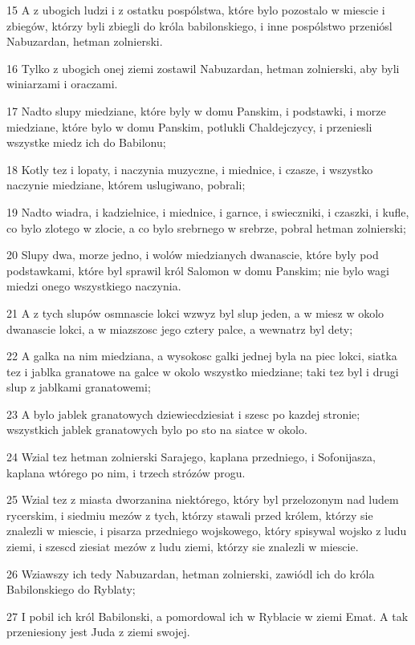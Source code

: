 \par 15 A z ubogich ludzi i z ostatku pospólstwa, które bylo pozostalo w miescie i zbiegów, którzy byli zbiegli do króla babilonskiego, i inne pospólstwo przeniósl Nabuzardan, hetman zolnierski.
\par 16 Tylko z ubogich onej ziemi zostawil Nabuzardan, hetman zolnierski, aby byli winiarzami i oraczami.
\par 17 Nadto slupy miedziane, które byly w domu Panskim, i podstawki, i morze miedziane, które bylo w domu Panskim, potlukli Chaldejczycy, i przeniesli wszystke miedz ich do Babilonu;
\par 18 Kotly tez i lopaty, i naczynia muzyczne, i miednice, i czasze, i wszystko naczynie miedziane, którem uslugiwano, pobrali;
\par 19 Nadto wiadra, i kadzielnice, i miednice, i garnce, i swieczniki, i czaszki, i kufle, co bylo zlotego w zlocie, a co bylo srebrnego w srebrze, pobral hetman zolnierski;
\par 20 Slupy dwa, morze jedno, i wolów miedzianych dwanascie, które byly pod podstawkami, które byl sprawil król Salomon w domu Panskim; nie bylo wagi miedzi onego wszystkiego naczynia.
\par 21 A z tych slupów osmnascie lokci wzwyz byl slup jeden, a w miesz w okolo dwanascie lokci, a w miazszosc jego cztery palce, a wewnatrz byl dety;
\par 22 A galka na nim miedziana, a wysokosc galki jednej byla na piec lokci, siatka tez i jablka granatowe na galce w okolo wszystko miedziane; taki tez byl i drugi slup z jablkami granatowemi;
\par 23 A bylo jablek granatowych dziewiecdziesiat i szesc po kazdej stronie; wszystkich jablek granatowych bylo po sto na siatce w okolo.
\par 24 Wzial tez hetman zolnierski Sarajego, kaplana przedniego, i Sofonijasza, kaplana wtórego po nim, i trzech strózów progu.
\par 25 Wzial tez z miasta dworzanina niektórego, który byl przelozonym nad ludem rycerskim, i siedmiu mezów z tych, którzy stawali przed królem, którzy sie znalezli w miescie, i pisarza przedniego wojskowego, który spisywal wojsko z ludu ziemi, i szescd ziesiat mezów z ludu ziemi, którzy sie znalezli w miescie.
\par 26 Wziawszy ich tedy Nabuzardan, hetman zolnierski, zawiódl ich do króla Babilonskiego do Ryblaty;
\par 27 I pobil ich król Babilonski, a pomordowal ich w Ryblacie w ziemi Emat. A tak przeniesiony jest Juda z ziemi swojej.
